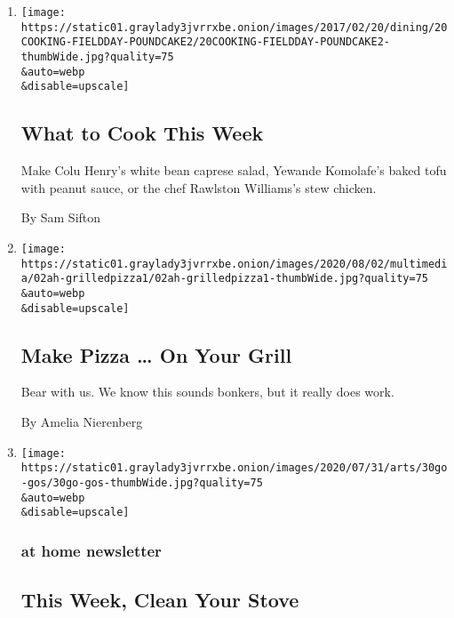 \begin{enumerate}
\def\labelenumi{\arabic{enumi}.}
\item
  \href{/2020/08/02/dining/what-to-cook-this-week.html}{}

  \texttt{[image: https://static01.graylady3jvrrxbe.onion/images/2017/02/20/dining/20COOKING-FIELDDAY-POUNDCAKE2/20COOKING-FIELDDAY-POUNDCAKE2-thumbWide.jpg?quality=75\\\&auto=webp\\\&disable=upscale]}

  \hypertarget{what-to-cook-this-week}{%
  \subsection{What to Cook This Week}\label{what-to-cook-this-week}}

  Make Colu Henry's white bean caprese salad, Yewande Komolafe's baked
  tofu with peanut sauce, or the chef Rawlston Williams's stew chicken.

  By Sam Sifton
\item
  \href{/2020/08/01/at-home/coronavirus-make-pizza-on-a-grill.html}{}

  \texttt{[image: https://static01.graylady3jvrrxbe.onion/images/2020/08/02/multimedia/02ah-grilledpizza1/02ah-grilledpizza1-thumbWide.jpg?quality=75\\\&auto=webp\\\&disable=upscale]}

  \hypertarget{make-pizza--on-your-grill}{%
  \subsection{Make Pizza \ldots{} On Your
  Grill}\label{make-pizza--on-your-grill}}

  Bear with us. We know this sounds bonkers, but it really does work.

  By Amelia Nierenberg
\item
  \href{/2020/07/31/at-home/newsletter.html}{}

  \texttt{[image: https://static01.graylady3jvrrxbe.onion/images/2020/07/31/arts/30go-gos/30go-gos-thumbWide.jpg?quality=75\\\&auto=webp\\\&disable=upscale]}

  \hypertarget{at-home-newsletter}{%
  \subsubsection{at home newsletter}\label{at-home-newsletter}}

  \hypertarget{this-week-clean-your-stove}{%
  \subsection{This Week, Clean Your
  Stove}\label{this-week-clean-your-stove}}


\end{enumerate}
